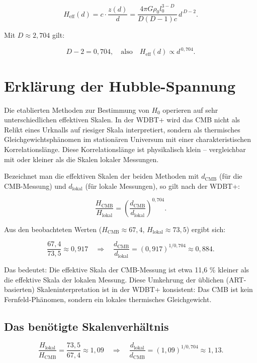 \documentclass[11pt]{article}
\begin{document}
\[
H_{\text{eff}}(d) = c \cdot \frac{z(d)}{d} = \frac{4\pi G\rho_0 l_0^{3-D}}{D(D-1)c} \, d^{\,D-2}. \tag{7}
\]

Mit \( D \approx 2,704 \) gilt:

\[
D-2 = 0,704, \quad \text{also} \quad H_{\text{eff}}(d) \propto d^{\,0,704}. \tag{8}
\]

\section{Erklärung der Hubble-Spannung}

Die etablierten Methoden zur Bestimmung von \( H_0 \) operieren auf sehr unterschiedlichen effektiven Skalen. In der WDBT+ wird das CMB nicht als Relikt eines Urknalls auf riesiger Skala interpretiert, sondern als thermisches Gleichgewichtsphänomen im stationären Universum mit einer charakteristischen Korrelationslänge. Diese Korrelationslänge ist physikalisch klein – vergleichbar mit oder kleiner als die Skalen lokaler Messungen.

Bezeichnet man die effektiven Skalen der beiden Methoden mit \( d_{\text{CMB}} \) (für die CMB-Messung) und \( d_{\text{lokal}} \) (für lokale Messungen), so gilt nach der WDBT+:

\[
\frac{H_{\text{CMB}}}{H_{\text{lokal}}} = \left( \frac{d_{\text{CMB}}}{d_{\text{lokal}}} \right)^{0,704}. \tag{9}
\]

Aus den beobachteten Werten (\( H_{\text{CMB}} \approx 67,4 \), \( H_{\text{lokal}} \approx 73,5 \)) ergibt sich:

\[
\frac{67,4}{73,5} \approx 0,917 \quad \Rightarrow \quad \frac{d_{\text{CMB}}}{d_{\text{lokal}}} = (0,917)^{1/0,704} \approx 0,884. \tag{10}
\]

Das bedeutet: Die effektive Skala der CMB-Messung ist etwa 11,6 \% kleiner als die effektive Skala der lokalen Messung. Diese Umkehrung der üblichen (ART-basierten) Skaleninterpretation ist in der WDBT+ konsistent: Das CMB ist kein Fernfeld-Phänomen, sondern ein lokales thermisches Gleichgewicht.

\subsection{Das benötigte Skalenverhältnis}

\[
\frac{H_{\text{lokal}}}{H_{\text{CMB}}} = \frac{73,5}{67,4} \approx 1,09 \quad \Rightarrow \quad \frac{d_{\text{lokal}}}{d_{\text{CMB}}} = (1,09)^{1/0,704} \approx 1,13. \tag{11}
\]
\end{document}
